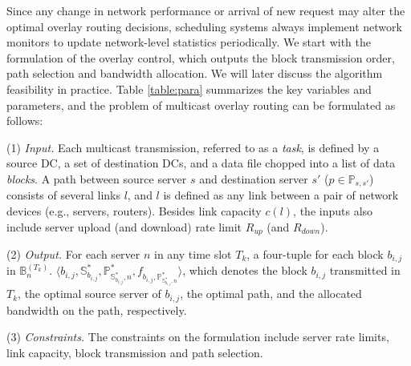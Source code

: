 Since any change in network performance or arrival of
new request may alter the optimal overlay
routing decisions, scheduling systems always implement network monitors to update network-level statistics periodically. We start with the formulation of the overlay control, which outputs the block transmission order, path selection and bandwidth allocation. We will later discuss the algorithm feasibility in practice.
Table \ref{table:para} summarizes the key variables and parameters, and the problem of multicast overlay routing can be formulated as follows:


\noindent(1) {\em Input.} %
Each multicast transmission, referred to as a {\em task}, is defined
by a source DC, a set of destination DCs, and a data file chopped into
a list of data {\em blocks}.
A path between source server $s$ and destination server $s'$ ($p\in \mathbb{P}_{s,s'}$) consists of several links $l$, and $l$ is defined as any link between a pair of network devices (e.g., servers, routers).
Besides link capacity $c(l)$, the inputs also include
server upload (and download) rate limit $R_{up}$ (and $R_{down}$).

\noindent(2) {\em Output.} For each server $n$ in any time slot $T_k$, a four-tuple for each block $b_{i,j}$ in $\mathbb{B}_n^{(T_k)}$. $\langle b_{i,j}, \mathbb{S}^*_{b_{i,j}}, \mathbb{P}^*_{\mathbb{S}^*_{b_{i,j}},n}, f_{b_{i,j},\mathbb{P}^*_{\mathbb{S}^*_{b_{i,j}},n}} \rangle$, which denotes the block $b_{i,j}$ transmitted in $T_k$, the optimal source server of $b_{i,j}$, the optimal path, and the allocated bandwidth on the path, respectively.

\noindent(3) {\em Constraints.}
The constraints on the formulation include server rate limits, link capacity, block transmission and path selection.

